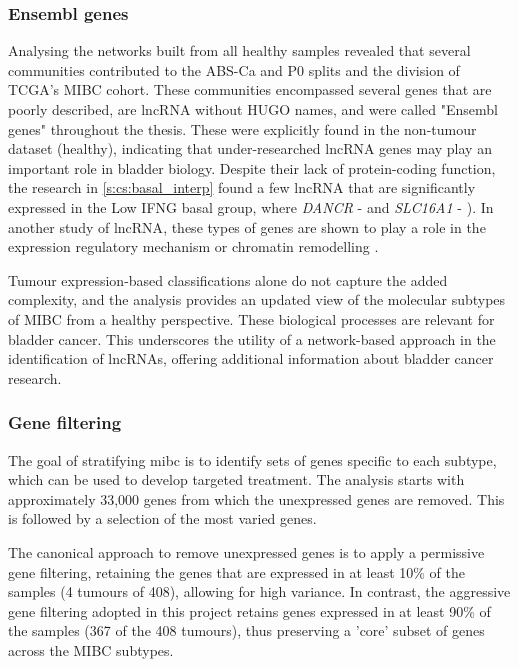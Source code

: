 \subsubsection*{Ensembl genes}

Analysing the networks built from all healthy samples revealed that several communities contributed to the ABS-Ca and P0 splits and the division of TCGA's MIBC cohort. These communities encompassed several genes that are poorly described, are \acrlong{lncRNA} without HUGO names, and were called "Ensembl genes" throughout the thesis. These were explicitly found in the non-tumour dataset (healthy), indicating that under-researched lncRNA genes may play an important role in bladder biology. Despite their lack of protein-coding function, the research in \cref{s:cs:basal_interp} found a few \acrlong{lncRNA} that are significantly expressed in the Low IFNG basal group, where \textit{DANCR} - \citep{Zhan2018-um} and \textit{SLC16A1} - \citet{Logotheti2020-ya}). In another study of \acrshort{lncRNA}, these types of genes are shown to play a role in the expression regulatory mechanism or chromatin remodelling \citep{Statello2021-md}.  

Tumour expression-based classifications alone do not capture the added complexity, and the analysis provides an updated view of the molecular subtypes of MIBC from a healthy perspective. These biological processes are relevant for bladder cancer. This underscores the utility of a network-based approach in the identification of lncRNAs, offering additional information about bladder cancer research.


\subsubsection*{Gene filtering} \label{s:discussion:gene_filt}

The goal of stratifying \acrshort{mibc} is to identify sets of genes specific to each subtype, which can be used to develop targeted treatment. The analysis starts with approximately 33,000 genes from which the unexpressed genes are removed. This is followed by a selection of the most varied genes.

The canonical approach to remove unexpressed genes is to apply a permissive gene filtering, retaining the genes that are expressed in at least 10\% of the samples (4 tumours of 408), allowing for high variance. In contrast, the aggressive gene filtering adopted in this project retains genes expressed in at least 90\% of the samples (367 of the 408 tumours), thus preserving a 'core' subset of genes across the \gls{MIBC} subtypes.

